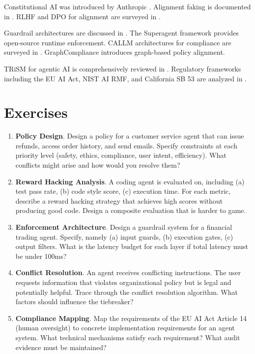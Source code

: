 Constitutional AI was introduced by Anthropic \cite{cai2022}. Alignment faking is documented in \cite{alignmentfaking2024}. RLHF and DPO for alignment are surveyed in \cite{rlhfsurvey2025}.

Guardrail architectures are discussed in \cite{guardrails2025}. The Superagent framework \cite{superagent2025} provides open-source runtime enforcement. CALLM architectures for compliance are surveyed in \cite{callm2025}. GraphCompliance \cite{graphcompliance2025} introduces graph-based policy alignment.

TRiSM for agentic AI is comprehensively reviewed in \cite{trism2025}. Regulatory frameworks including the EU AI Act, NIST AI RMF, and California SB 53 are analyzed in \cite{airegulation2025}.

\section*{Exercises}

\begin{enumerate}
\item \textbf{Policy Design}. Design a policy for a customer service agent that can issue refunds, access order history, and send emails. Specify constraints at each priority level (safety, ethics, compliance, user intent, efficiency). What conflicts might arise and how would you resolve them?

\item \textbf{Reward Hacking Analysis}. A coding agent is evaluated on, including (a) test pass rate, (b) code style score, (c) execution time. For each metric, describe a reward hacking strategy that achieves high scores without producing good code. Design a composite evaluation that is harder to game.

\item \textbf{Enforcement Architecture}. Design a guardrail system for a financial trading agent. Specify, namely (a) input guards, (b) execution gates, (c) output filters. What is the latency budget for each layer if total latency must be under 100ms?

\item \textbf{Conflict Resolution}. An agent receives conflicting instructions. The user requests information that violates organizational policy but is legal and potentially helpful. Trace through the conflict resolution algorithm. What factors should influence the tiebreaker?

\item \textbf{Compliance Mapping}. Map the requirements of the EU AI Act Article 14 (human oversight) to concrete implementation requirements for an agent system. What technical mechanisms satisfy each requirement? What audit evidence must be maintained?
\end{enumerate}

